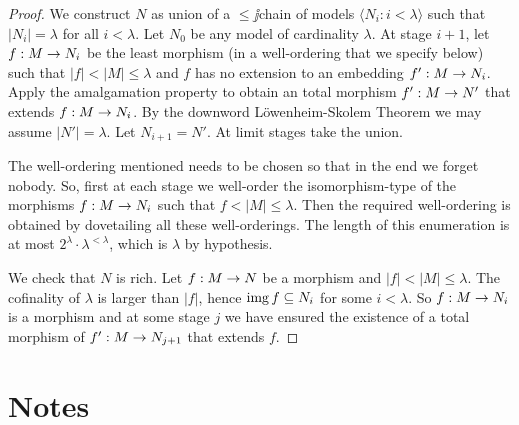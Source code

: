 \documentclass[creche.tex]{subfiles}
\begin{document}
\begin{proof} We construct $N$ as union of a $\le\jj$chain of models $\langle N_i:i < \lambda\rangle$ such that $|N_i| = \lambda$ for all $i<\lambda$. Let $N_0$ be any model of cardinality $\lambda$. At stage $i+1$, let $f:M\rightarrow N_i$ be the least morphism (in a well-ordering that we specify below) such that $|f|<|M|\le\lambda$ and $f$ has no extension to an embedding $f':M\rightarrow N_i$. Apply the amalgamation property to obtain an total morphism $f':M\rightarrow N'$ that extends $f:M\rightarrow N_i$. By the downword L\"owenheim-Skolem Theorem we may assume $|N'|=\lambda$. Let $N_{i+1}=N'$. At limit stages take the union.

The well-ordering mentioned needs to be chosen so that in the end we forget nobody. So, first at each stage we well-order the isomorphism-type of the morphisms $f:M\rightarrow N_i$ such that  $f<|M|\le\lambda$. Then the required well-ordering is obtained by dovetailing all these well-orderings.  The length of this enumeration is at most $2^\lambda\cdot\lambda^{<\lambda}$, which is $\lambda$ by hypothesis.

We check that $N$ is rich. Let $f:M\rightarrow N$ be a morphism and $|f|<|M|\le\lambda$. The cofinality of $\lambda$ is larger than $|f|$, hence $\mathop{\rm img} f\subseteq N_i$ for some $i<\lambda$. So $f:M\rightarrow N_i$ is a morphism and at some stage $j$ we have ensured the existence of a total morphism of $f':M\rightarrow N_{j+1}$ that extends $f$.
\end{proof}



\section{Notes}
\begin{biblist}[]\normalsize

   

\end{biblist}
\end{document}
